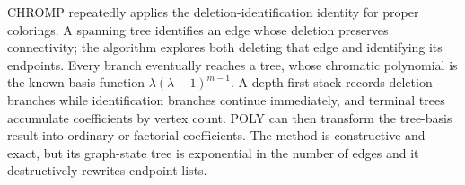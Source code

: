 \documentclass[10pt,letterpaper]{article}
\begin{document}
\begin{tcolorbox}[colback=Ink!4,colframe=Ink,title=Cornell summary]
CHROMP repeatedly applies the deletion-identification identity for proper colorings. A spanning tree identifies an edge whose deletion preserves connectivity; the algorithm explores both deleting that edge and identifying its endpoints. Every branch eventually reaches a tree, whose chromatic polynomial is the known basis function $\lambda(\lambda-1)^{m-1}$. A depth-first stack records deletion branches while identification branches continue immediately, and terminal trees accumulate coefficients by vertex count. POLY can then transform the tree-basis result into ordinary or factorial coefficients. The method is constructive and exact, but its graph-state tree is exponential in the number of edges and it destructively rewrites endpoint lists.
\end{tcolorbox}
\end{document}

